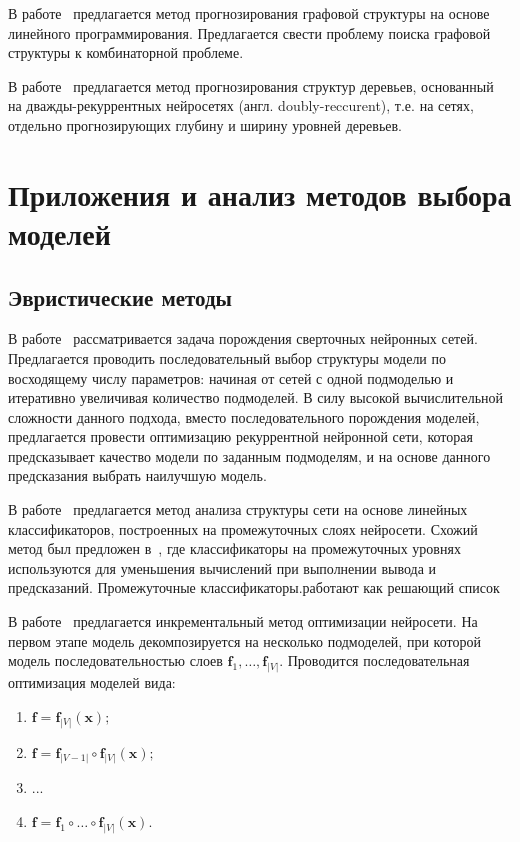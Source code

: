 В работе~\cite{jaakkola2010learning} предлагается метод прогнозирования графовой структуры на основе линейного программирования. Предлагается свести проблему поиска графовой структуры к комбинаторной проблеме.

В работе~\cite{double_rnn} предлагается метод прогнозирования структур деревьев, основанный на дважды-рекуррентных нейросетях (англ. doubly-reccurent), т.е. на сетях, отдельно прогнозирующих глубину и ширину уровней деревьев.


\section{Приложения и анализ методов выбора моделей}
\subsection*{Эвристические методы}

В работе~\cite{search_smbo} рассматривается задача порождения сверточных нейронных сетей. Предлагается проводить последовательный выбор структуры модели по восходящему числу параметров: начиная от сетей с одной подмоделью  и итеративно увеличивая количество подмоделей. В силу высокой вычислительной сложности данного подхода, вместо последовательного порождения моделей, предлагается провести оптимизацию рекуррентной нейронной сети, которая предсказывает качество модели по заданным подмоделям, и на основе данного предсказания выбрать наилучшую модель.
 
 
 
В работе~\cite{layer_probe} предлагается метод анализа структуры сети на основе линейных классификаторов, построенных на промежуточных слоях нейросети.
Схожий метод был предложен в~\cite{branches}, где классификаторы на промежуточных уровнях используются для уменьшения вычислений при выполнении вывода и предсказаний.
Промежуточные классификаторы.работают как решающий список

В работе~\cite{nn_inc} предлагается инкрементальный метод оптимизации нейросети. На первом этапе модель декомпозируется на несколько подмоделей, при которой модель последовательностью слоев $\mathbf{f}_1,\dots,\mathbf{f}_{|V|}$. Проводится последовательная оптимизация моделей вида:
\begin{enumerate}
\item $\mathbf{f} = \mathbf{f}_{|V|} (\mathbf{x});$
\item $\mathbf{f} = \mathbf{f}_{|V-1|} \circ \mathbf{f}_{|V|} (\mathbf{x});$
\item ...
\item $\mathbf{f} = \mathbf{f}_{1} \circ \dots \circ \mathbf{f}_{|V|} (\mathbf{x}).$
\end{enumerate}


